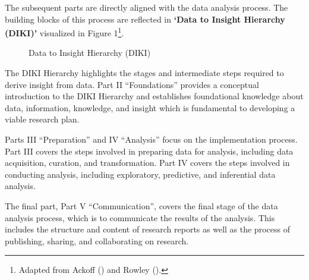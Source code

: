 \documentclass[
  letterpaper,
  DIV=11,
  numbers=noendperiod]{scrreprt}
\theoremstyle{definition}
\theoremstyle{remark}
\begin{document}
The subsequent parts are directly aligned with the data analysis
process. The building blocks of this process are reflected in
\textbf{`Data to Insight Hierarchy
(DIKI)'} visualized in Figure 1\footnote{Adapted from Ackoff
  () and Rowley
  ().}.

\begin{figure}[H]


\caption{\label{fig-diki-hierarchy}Data to Insight Hierarchy (DIKI)}

\end{figure}%

The DIKI Hierarchy highlights the stages and intermediate steps required
to derive insight from data. Part II ``Foundations'' provides a
conceptual introduction to the DIKI Hierarchy and establishes
foundational knowledge about data, information, knowledge, and insight
which is fundamental to developing a viable research plan.

Parts III ``Preparation'' and IV ``Analysis'' focus on the
implementation process. Part III covers the steps involved in preparing
data for analysis, including data acquisition, curation, and
transformation. Part IV covers the steps involved in conducting
analysis, including exploratory, predictive, and inferential data
analysis.

The final part, Part V ``Communication'', covers the final stage of the
data analysis process, which is to communicate the results of the
analysis. This includes the structure and content of research reports as
well as the process of publishing, sharing, and collaborating on
research.
\end{document}

